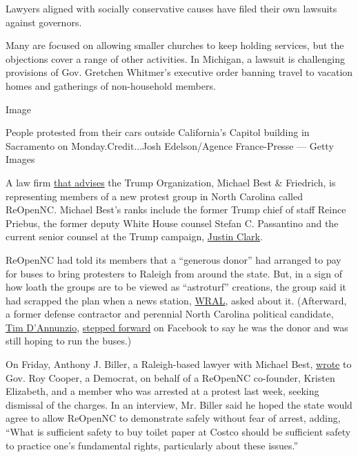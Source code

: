 Lawyers aligned with socially conservative causes have filed their own
lawsuits against governors.

Many are focused on allowing smaller churches to keep holding services,
but the objections cover a range of other activities. In Michigan, a
lawsuit is challenging provisions of Gov. Gretchen Whitmer's executive
order banning travel to vacation homes and gatherings of non-household
members.

Image

People protested from their cars outside California's Capitol building
in Sacramento on Monday.Credit...Josh Edelson/Agence France-Presse ---
Getty Images

A law firm
\href{https://www.cnn.com/2019/01/11/politics/trump-organization-oversight-passantino/index.html}{that
advises} the Trump Organization, Michael Best \& Friedrich, is
representing members of a new protest group in North Carolina called
ReOpenNC. Michael Best's ranks include the former Trump chief of staff
Reince Priebus, the former deputy White House counsel Stefan C.
Passantino and the current senior counsel at the Trump campaign,
\href{https://www.politico.com/story/2019/06/03/playbook-birthday-justin-clark-1351103}{Justin
Clark}.

ReOpenNC had told its members that a ``generous donor'' had arranged to
pay for buses to bring protesters to Raleigh from around the state. But,
in a sign of how loath the groups are to be viewed as ``astroturf''
creations, the group said it had scrapped the plan when a news station,
\href{https://www.wral.com/coronavirus/reopennc-rally-planned-for-tuesday-in-downtown-raleigh/19062732/}{WRAL},
asked about it. (Afterward, a former defense contractor and perennial
North Carolina political candidate,
\href{https://www.charlotteobserver.com/news/politics-government/article9100739.html}{Tim
D'Annunzio},
\href{https://twitter.com/search?q=Tim\%20D\%27Annunzio\&src=typed_query}{stepped
forward} on Facebook to say he was the donor and was still hoping to run
the buses.)

On Friday, Anthony J. Biller, a Raleigh-based lawyer with Michael Best,
\href{https://wwwcache.wral.com/asset/news/state/nccapitol/2020/04/19/19062754/Biller_letter_to_Governor_Cooper_and_Comm_Ford_4_18-DMID1-5mk0it4ph.pdf}{wrote}
to Gov. Roy Cooper, a Democrat, on behalf of a ReOpenNC co-founder,
Kristen Elizabeth, and a member who was arrested at a protest last week,
seeking dismissal of the charges. In an interview, Mr. Biller said he
hoped the state would agree to allow ReOpenNC to demonstrate safely
without fear of arrest, adding, ``What is sufficient safety to buy
toilet paper at Costco should be sufficient safety to practice one's
fundamental rights, particularly about these issues.''

